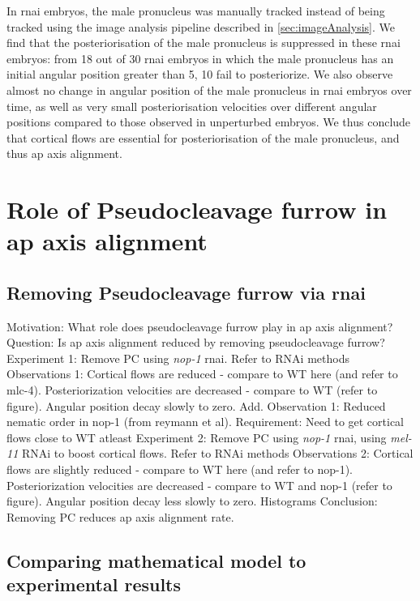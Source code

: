 In  \ac{rnai} embryos, the male pronucleus was manually tracked instead of being tracked using the image analysis pipeline described in \autoref{sec:imageAnalysis}. We find that the posteriorisation of the male pronucleus is suppressed in these \ac{rnai} embryos: from \num{18} out of \num{30} \ac{rnai} embryos in which the male pronucleus has an initial angular position greater than \SI{5}{\unitAngle}, \num{10} fail to posteriorize. We also observe almost no change in angular position of the male pronucleus in \ac{rnai} embryos over time, as well as very small posteriorisation velocities over different angular positions compared to those observed in unperturbed embryos. We thus conclude that cortical flows are essential for posteriorisation of the male pronucleus, and thus \ac{ap} axis alignment.

\section{Role of Pseudocleavage furrow in \ac{ap} axis alignment}\label{sec:PcFurrowRole}
\subsection{Removing Pseudocleavage furrow via \ac{rnai}}\label{subsec:Nop1AndNop1Mel11}
Motivation: What role does pseudocleavage furrow play in \ac{ap} axis alignment?
Question: Is \ac{ap} axis alignment reduced by removing pseudocleavage furrow?
Experiment 1: Remove PC using \textit{nop-1} \ac{rnai}. Refer to RNAi methods
Observations 1: Cortical flows are reduced - compare to WT here (and refer to mlc-4). Posteriorization velocities are decreased - compare to WT (refer to figure). Angular position decay slowly to zero. 
Add. Observation 1: Reduced nematic order in nop-1 (from reymann et al).
Requirement: Need to get cortical flows close to WT atleast
Experiment 2: Remove PC using \textit{nop-1} \ac{rnai}, using \textit{mel-11} RNAi to boost cortical flows. Refer to RNAi methods
Observations 2: Cortical flows are slightly reduced - compare to WT here (and refer to nop-1). Posteriorization velocities are decreased - compare to WT and nop-1 (refer to figure). Angular position decay less slowly to zero. Histograms
Conclusion: Removing PC reduces \ac{ap} axis alignment rate.

\subsection{Comparing mathematical model to experimental results}\label{subsec:expVsTheoryPcFurrow}
